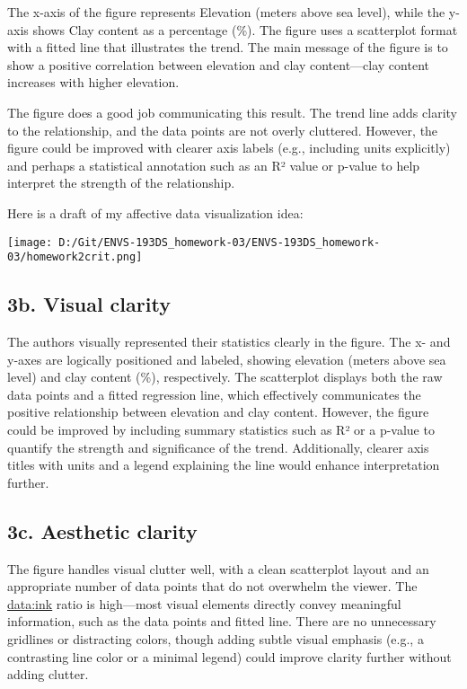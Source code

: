 \documentclass[
]{article}
\begin{document}
The x-axis of the figure represents Elevation (meters above sea level),
while the y-axis shows Clay content as a percentage (\%). The figure
uses a scatterplot format with a fitted line that illustrates the trend.
The main message of the figure is to show a positive correlation between
elevation and clay content---clay content increases with higher
elevation.

The figure does a good job communicating this result. The trend line
adds clarity to the relationship, and the data points are not overly
cluttered. However, the figure could be improved with clearer axis
labels (e.g., including units explicitly) and perhaps a statistical
annotation such as an R² value or p-value to help interpret the strength
of the relationship.

Here is a draft of my affective data visualization idea:

\texttt{[image: D:/Git/ENVS-193DS\_homework-03/ENVS-193DS\_homework-03/homework2crit.png]}

\subsection{3b. Visual clarity}\label{b.-visual-clarity}

The authors visually represented their statistics clearly in the figure.
The x- and y-axes are logically positioned and labeled, showing
elevation (meters above sea level) and clay content (\%), respectively.
The scatterplot displays both the raw data points and a fitted
regression line, which effectively communicates the positive
relationship between elevation and clay content. However, the figure
could be improved by including summary statistics such as R² or a
p-value to quantify the strength and significance of the trend.
Additionally, clearer axis titles with units and a legend explaining the
line would enhance interpretation further.

\subsection{3c. Aesthetic clarity}\label{c.-aesthetic-clarity}

The figure handles visual clutter well, with a clean scatterplot layout
and an appropriate number of data points that do not overwhelm the
viewer. The \url{data:ink} ratio is high---most visual elements directly
convey meaningful information, such as the data points and fitted line.
There are no unnecessary gridlines or distracting colors, though adding
subtle visual emphasis (e.g., a contrasting line color or a minimal
legend) could improve clarity further without adding clutter.
\end{document}
